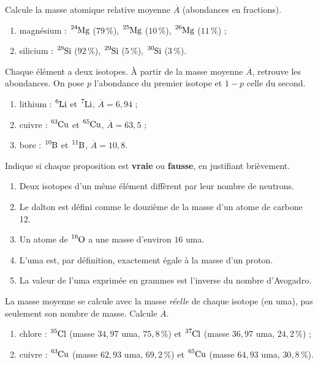 \documentclass[11pt,a4paper]{article}
\begin{document}
\begin{exo}
Calcule la masse atomique relative moyenne $\overline{A}$ (abondances en fractions).
\begin{enumerate}[label=\alph*)]
  \item magnésium : $\ce{^{24}Mg}$ ($79\,\%$), $\ce{^{25}Mg}$ ($10\,\%$), $\ce{^{26}Mg}$ ($11\,\%$) ;
  \item silicium : $\ce{^{28}Si}$ ($92\,\%$), $\ce{^{29}Si}$ ($5\,\%$), $\ce{^{30}Si}$ ($3\,\%$).
\end{enumerate}
\end{exo}

\begin{exo}
Chaque élément a deux isotopes. À partir de la masse moyenne $\overline{A}$, retrouve les abondances.
On pose $p$ l'abondance du premier isotope et $1-p$ celle du second.
\begin{enumerate}[label=\alph*)]
  \item lithium : $\ce{^{6}Li}$ et $\ce{^{7}Li}$, $\overline{A} = 6{,}94$ ;
  \item cuivre : $\ce{^{63}Cu}$ et $\ce{^{65}Cu}$, $\overline{A} = 63{,}5$ ;
  \item bore : $\ce{^{10}B}$ et $\ce{^{11}B}$, $\overline{A} = 10{,}8$.
\end{enumerate}
\end{exo}

\begin{exo}
Indique si chaque proposition est \textbf{vraie} ou \textbf{fausse}, en justifiant brièvement.
\begin{enumerate}[label=\alph*)]
  \item Deux isotopes d'un même élément diffèrent par leur nombre de neutrons.
  \item Le dalton est défini comme le douzième de la masse d'un atome de carbone 12.
  \item Un atome de $\ce{^{16}O}$ a une masse d'environ $16$ uma.
  \item L'uma est, par définition, exactement égale à la masse d'un proton.
  \item La valeur de l'uma exprimée en grammes est l'inverse du nombre d'Avogadro.
\end{enumerate}
\end{exo}

\begin{exo}
La masse moyenne se calcule avec la masse \emph{réelle} de chaque isotope (en uma), pas seulement son
nombre de masse. Calcule $\overline{A}$.
\begin{enumerate}[label=\alph*)]
  \item chlore : $\ce{^{35}Cl}$ (masse $34{,}97$ uma, $75{,}8\,\%$) et $\ce{^{37}Cl}$
        (masse $36{,}97$ uma, $24{,}2\,\%$) ;
  \item cuivre : $\ce{^{63}Cu}$ (masse $62{,}93$ uma, $69{,}2\,\%$) et $\ce{^{65}Cu}$
        (masse $64{,}93$ uma, $30{,}8\,\%$).
\end{enumerate}
\end{exo}
\end{document}
